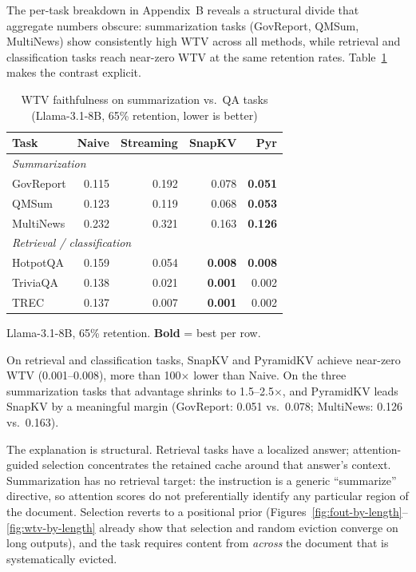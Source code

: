 \documentclass[10pt,letterpaper]{article}
\begin{document}
\label{summarization-hardest-case}%
The per-task breakdown in Appendix~B reveals a structural divide that aggregate numbers obscure: summarization tasks (GovReport, QMSum, MultiNews) show consistently high WTV across all methods, while retrieval and classification tasks reach near-zero WTV at the same retention rates. Table~\ref{tab:t-summ} makes the contrast explicit.

\begin{table}[H]
\centering
\small
\caption{WTV faithfulness on summarization vs.\ QA tasks (Llama-3.1-8B, 65\% retention, lower is better)}
\label{tab:t-summ}
\begin{tabular}{@{}lrrrr@{}}
\toprule
Task & Naive & Streaming & SnapKV & Pyr\\
\midrule
\multicolumn{5}{l}{\textit{Summarization}}\\
GovReport & 0.115 & 0.192 & 0.078 & \textbf{0.051}\\
QMSum     & 0.123 & 0.119 & 0.068 & \textbf{0.053}\\
MultiNews & 0.232 & 0.321 & 0.163 & \textbf{0.126}\\
\midrule
\multicolumn{5}{l}{\textit{Retrieval / classification}}\\
HotpotQA  & 0.159 & 0.054 & \textbf{0.008} & \textbf{0.008}\\
TriviaQA  & 0.138 & 0.021 & \textbf{0.001} & 0.002\\
TREC      & 0.137 & 0.007 & \textbf{0.001} & 0.002\\
\bottomrule
\end{tabular}

\center Llama-3.1-8B, 65\% retention. \textbf{Bold} = best per row.
\end{table}

On retrieval and classification tasks, SnapKV and PyramidKV achieve near-zero WTV
(0.001--0.008), more than 100$\times$ lower than Naive. On the three summarization tasks that
advantage shrinks to 1.5--2.5$\times$, and PyramidKV leads SnapKV by a meaningful margin
(GovReport: 0.051 vs.\ 0.078; MultiNews: 0.126 vs.\ 0.163).

The explanation is structural. Retrieval tasks have a localized answer; attention-guided selection
concentrates the retained cache around that answer's context. Summarization has no retrieval
target: the instruction is a generic ``summarize'' directive, so attention scores do not
preferentially identify any particular region of the document. Selection reverts to a positional
prior (Figures~\ref{fig:fout-by-length}--\ref{fig:wtv-by-length}
already show that selection and random eviction converge on long outputs), and the task requires
content from \emph{across} the document that is systematically evicted.
\end{document}
